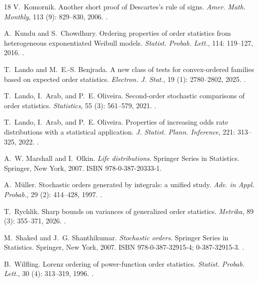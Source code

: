 \documentclass [11pt]{article}
\begin{document}
\begin{thebibliography}{18}
V.~Komornik.
\newblock Another short proof of {D}escartes's rule of signs.
\newblock \emph{Amer. Math. Monthly}, 113 (9): 829--830,
  2006.
\newblock {}.

A.~Kundu and S.~Chowdhury.
\newblock Ordering properties of order statistics from heterogeneous
  exponentiated {W}eibull models.
\newblock \emph{Statist. Probab. Lett.}, 114: 119--127, 2016.
\newblock {}.

T.~Lando and M.~E.-S. Benjrada.
\newblock A new class of tests for convex-ordered families based on expected
  order statistics.
\newblock \emph{Electron. J. Stat.}, 19 (1): 2780--2802,
  2025.
\newblock {}.

T.~Lando, I.~Arab, and P.~E. Oliveira.
\newblock Second-order stochastic comparisons of order statistics.
\newblock \emph{Statistics}, 55 (3): 561--579, 2021.
\newblock {}.

T.~Lando, I.~Arab, and P.~E. Oliveira.
\newblock Properties of increasing odds rate distributions with a statistical
  application.
\newblock \emph{J. Statist. Plann. Inference}, 221: 313--325, 2022.
\newblock {}.

A.~W. Marshall and I.~Olkin.
\newblock \emph{Life distributions}.
\newblock Springer Series in Statistics. Springer, New York, 2007.
\newblock ISBN 978-0-387-20333-1.

A.~M\"{u}ller.
\newblock Stochastic orders generated by integrals: a unified study.
\newblock \emph{Adv. in Appl. Probab.}, 29 (2): 414--428,
  1997.
\newblock {}.

T.~Rychlik.
\newblock Sharp bounds on variances of generalized order statistics.
\newblock \emph{Metrika}, 89 (3): 355--371, 2026.
\newblock {}.

M.~Shaked and J.~G. Shanthikumar.
\newblock \emph{Stochastic orders}.
\newblock Springer Series in Statistics. Springer, New York, 2007.
\newblock ISBN 978-0-387-32915-4; 0-387-32915-3.
\newblock {}.

B.~Wilfling.
\newblock Lorenz ordering of power-function order statistics.
\newblock \emph{Statist. Probab. Lett.}, 30 (4): 313--319,
  1996.
\newblock {}.

\end{thebibliography}
\end{document}
